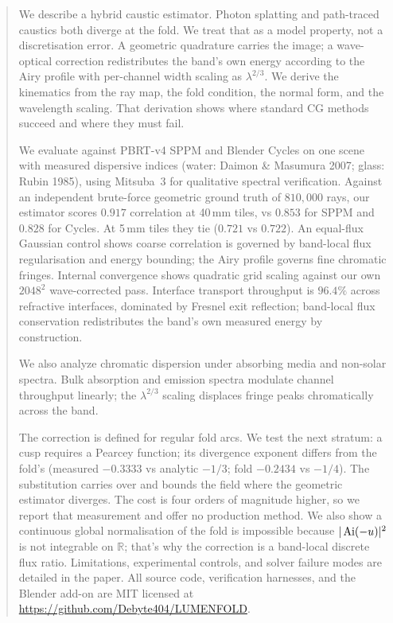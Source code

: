 \begin{abstract}
We describe a hybrid caustic estimator. Photon splatting and path-traced caustics both diverge at the fold. We treat that as a model property, not a discretisation error. A geometric quadrature carries the image; a wave-optical correction redistributes the band's own energy according to the Airy profile with per-channel width scaling as $\lambda^{2/3}$. We derive the kinematics from the ray map, the fold condition, the normal form, and the wavelength scaling. That derivation shows where standard CG methods succeed and where they must fail.

We evaluate against PBRT-v4 SPPM and Blender Cycles on one scene with measured dispersive indices (water: Daimon \& Masumura 2007; glass: Rubin 1985), using Mitsuba~3 for qualitative spectral verification. Against an independent brute-force geometric ground truth of $810{,}000$ rays, our estimator scores $0.917$ correlation at 40\,mm tiles, vs $0.853$ for SPPM and $0.828$ for Cycles. At 5\,mm tiles they tie ($0.721$ vs $0.722$). An equal-flux Gaussian control shows coarse correlation is governed by band-local flux regularisation and energy bounding; the Airy profile governs fine chromatic fringes. Internal convergence shows quadratic grid scaling against our own $2048^2$ wave-corrected pass. Interface transport throughput is $96.4\%$ across refractive interfaces, dominated by Fresnel exit reflection; band-local flux conservation redistributes the band's own measured energy by construction.

We also analyze chromatic dispersion under absorbing media and non-solar spectra. Bulk absorption and emission spectra modulate channel throughput linearly; the $\lambda^{2/3}$ scaling displaces fringe peaks chromatically across the band.

The correction is defined for regular fold arcs. We test the next stratum: a cusp requires a Pearcey function; its divergence exponent differs from the fold's (measured $-0.3333$ vs analytic $-1/3$; fold $-0.2434$ vs $-1/4$). The substitution carries over and bounds the field where the geometric estimator diverges. The cost is four orders of magnitude higher, so we report that measurement and offer no production method. We also show a continuous global normalisation of the fold is impossible because $|\Ai(-u)|^2$ is not integrable on $\mathbb{R}$; that's why the correction is a band-local discrete flux ratio. Limitations, experimental controls, and solver failure modes are detailed in the paper. All source code, verification harnesses, and the Blender add-on are MIT licensed at \url{https://github.com/Debyte404/LUMENFOLD}.
\end{abstract}

